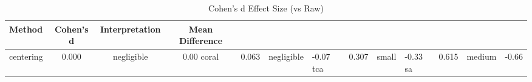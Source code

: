 \begin{table}[htbp]
\centering
\caption{Cohen's d Effect Size (vs Raw)}
\label{tab:cohend}
\begin{tabular}{lccc}
\toprule
Method & Cohen's d & Interpretation & Mean Difference \\
\midrule
centering & 0.000 & negligible & 0.00%
coral & 0.063 & negligible & -0.07%
tca & 0.307 & small & -0.33%
sa & 0.615 & medium & -0.66%
\bottomrule
\end{tabular}
\end{table}